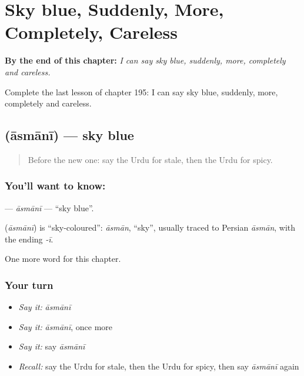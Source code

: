 
\chapter{Sky blue, Suddenly, More, Completely, Careless}
\label{ch:ur-sky-blue-suddenly-more-completely-careless}

\begin{chapteropening}
\textbf{By the end of this chapter:} \emph{I can say sky blue, suddenly, more, completely and careless.}

Complete the last lesson of chapter 195: I can say sky blue, suddenly, more, completely and careless.
\end{chapteropening}

\section[\texorpdfstring{\ur{آسمانی} (āsmānī)}{آسمانی (āsmānī)}]{ (āsmānī) — sky blue}

\label{lesson:UR-C195-asmani}



\begin{quote}
Before the new one: say the Urdu for stale, then the Urdu for spicy.
\end{quote}

\subsection*{You'll want to know: }
\textbf{} — \emph{āsmānī} — \textquotedblleft{}sky blue\textquotedblright{}.

\begin{cousinweb}
\textbf{} (\emph{āsmānī}) is \textquotedblleft{}sky-coloured\textquotedblright{}: \emph{āsmān}, \textquotedblleft{}sky\textquotedblright{}, usually traced to Persian \emph{āsmān}, with the ending \emph{-ī}.
\end{cousinweb}

\begin{grammarlens}[title={What you've built}]
One more word for this chapter.
\end{grammarlens}

\subsection*{Your turn}
\begin{itemize}
\raggedright
  \item \emph{Say it:} \emph{āsmānī}
  \item \emph{Say it:} \emph{āsmānī}, once more
  \item \emph{Say it:} say \emph{āsmānī}
  \item \emph{Recall:} say the Urdu for stale, then the Urdu for spicy, then say \emph{āsmānī} again
\end{itemize}

